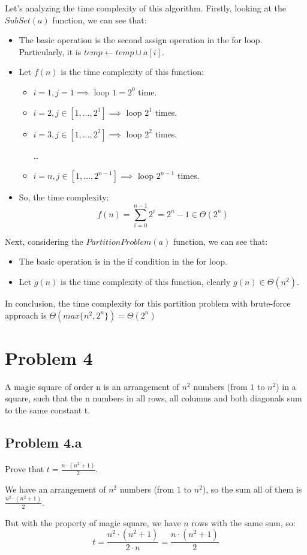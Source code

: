 \documentclass[a4paper]{article}
\begin{document}
Let's analyzing the time complexity of this algorithm. Firstly, looking at the $SubSet(a)$ function, we can see that: 
\begin{itemize}
    \item The basic operation is the second assign operation in the for loop. Particularly, it is $temp \gets temp \cup a[i]$.
    \item Let $f(n)$ is the time complexity of this function: 
    \begin{itemize}
        \item $i=1, j=1 \implies$ loop $1=2^0$ time.
        \item $i=2, j \in [1, \ldots, 2^1] \implies$ loop $2^1$ times.
        \item $i=3, j \in [1, \ldots, 2^2] \implies$ loop $2^2$ times.
        \par
        \ldots
        \item $i=n, j \in [1, \ldots, 2^{n-1}] \implies$ loop $2^{n-1}$ times.
    \end{itemize}
    \item So, the time complexity:
    \begin{equation*}
        f(n) = \sum_{i=0}^{n-1}{2^i} = 2^n - 1 \in \Theta(2^n)
    \end{equation*}
\end{itemize}
Next, considering the $PartitionProblem(a)$ function, we can see that:
\begin{itemize}
    \item The basic operation is in the if condition in the for loop.
    \item Let $g(n)$ is the time complexity of this function, clearly $g(n) \in \Theta(n^2)$.
\end{itemize}
In conclusion, the time complexity for this partition problem with brute-force approach is $\Theta(max\{n^2,2^n\}) = \Theta(2^n)$
\newpage
\section{Problem 4}
A magic square of order n is an arrangement of $n^2$ numbers (from $1$ to $n^2$) in a square, such that the n numbers in all rows, all columns and both diagonals sum to the same constant t.
\subsection{Problem 4.a}
Prove that $t = \frac{n\cdot(n^2+1)}{2}$. \par
We have an arrangement of $n^2$ numbers (from $1$ to $n^2$), so the sum all of them is $\frac{n^2 \cdot (n^2+1)}{2}$.\par
But with the property of magic square, we have $n$ rows with the same sum, so: 
\begin{equation*}
    t = \frac{n^2 \cdot (n^2+1)}{2\cdot n} = \frac{n \cdot (n^2+1)}{2}
\end{equation*}
\end{document}
